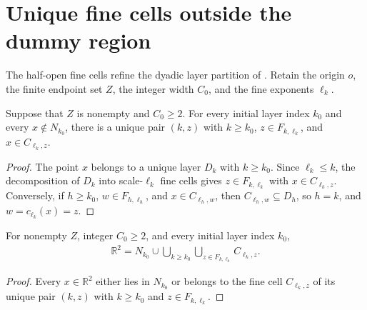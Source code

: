 \section{Unique fine cells outside the dummy region}
\label{sec:area_law_fine_cell_partition}

The half-open fine cells refine the dyadic layer partition of
\cite[Section~11]{OpenAI2026AreaLaw}. Retain the origin $o$, the finite
endpoint set $Z$, the integer width $C_0$, and the fine exponents $\ell_k$.


\begin{lemma}
    \label{thm:area_law_unique_fine_cell}
    \leanok
    Suppose that $Z$ is nonempty and $C_0\ge2$. For every initial layer index
    $k_0$ and every $x\notin N_{k_0}$, there is a unique pair $(k,z)$
    with $k\ge k_0$, $z\in F_{k,\ell_k}$, and $x\in C_{\ell_k,z}$.
\end{lemma}
\begin{proof}\leanok
    The point $x$ belongs to a unique layer $D_k$ with $k\ge k_0$. Since
    $\ell_k\le k$, the decomposition of $D_k$ into scale-$\ell_k$ fine cells
    gives $z\in F_{k,\ell_k}$ with $x\in C_{\ell_k,z}$. Conversely, if
    $h\ge k_0$, $w\in F_{h,\ell_h}$, and $x\in C_{\ell_h,w}$, then
    $C_{\ell_h,w}\subseteq D_h$, so $h=k$, and $w=c_{\ell_k}(x)=z$.
\end{proof}

\begin{lemma}
    \label{thm:area_law_dummy_fine_cells_cover}
    \leanok
    For nonempty $Z$, integer $C_0\ge2$, and every initial layer index $k_0$,
    \begin{align}
        \mathbb R^2=N_{k_0}\cup\bigcup_{k\ge k_0}
        \bigcup_{z\in F_{k,\ell_k}}C_{\ell_k,z}.
    \end{align}
\end{lemma}
\begin{proof}\leanok
    Every $x\in\mathbb R^2$ either lies in $N_{k_0}$ or belongs to the fine
    cell $C_{\ell_k,z}$ of its unique pair $(k,z)$ with $k\ge k_0$ and
    $z\in F_{k,\ell_k}$.
\end{proof}

